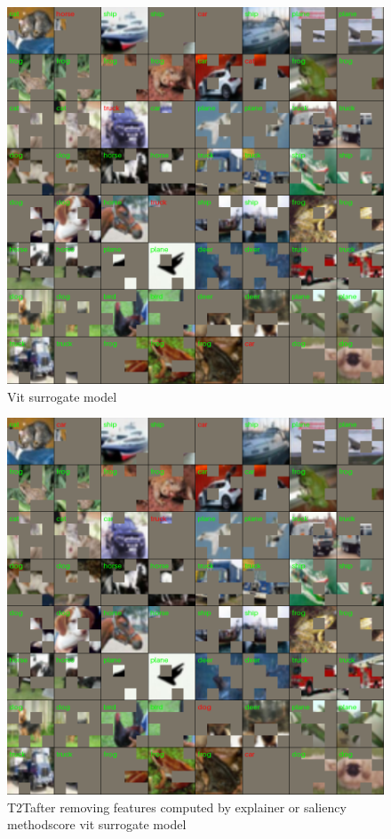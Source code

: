 \documentclass[magisterska,en]{pracamgr}
\begin{document}
\begin{figure}[H]
\centering
\includegraphics[scale=0.5]{./images/vit_surrogate_masks.png}
\caption{Vit surrogate model}
\label{vit_surrogate_masks}
\end{figure}


\begin{figure}[H]
\centering
\includegraphics[scale=0.5]{./images/t2t_vit_surrogate_masks.png}
\caption{T2T\textdel after removing features computed by explainer or saliency methodscore vit surrogate model}
\label{t2t_vit_surrogate_masks}
\end{figure}
\end{document}
